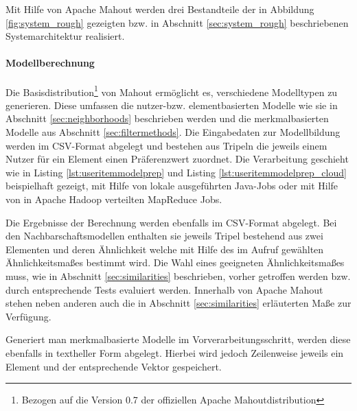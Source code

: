 
Mit Hilfe von Apache Mahout werden drei  Bestandteile der in Abbildung \ref{fig:system_rough} gezeigten bzw. in Abschnitt \ref{sec:system_rough} beschriebenen Systemarchitektur realisiert. 

\paragraph{Modellberechnung} Die Basisdistribution\footnote{Bezogen auf die Version 0.7 der offiziellen Apache Mahoutdistribution} von Mahout ermöglicht es, verschiedene Modelltypen zu generieren. Diese umfassen die nutzer-bzw. elementbasierten Modelle wie sie in Abschnitt \ref{sec:neighborhoods} beschrieben werden und die merkmalbasierten Modelle aus Abschnitt \ref{sec:filtermethods}. Die Eingabedaten zur Modellbildung werden im CSV-Format abgelegt und bestehen aus Tripeln die jeweils einem Nutzer für ein Element einen Präferenzwert zuordnet. Die Verarbeitung geschieht wie in Listing \ref{lst:useritemmodelprep} und Listing \ref{lst:useritemmodelprep_cloud} beispielhaft gezeigt, mit Hilfe von lokale ausgeführten Java-Jobs oder mit Hilfe von in Apache Hadoop verteilten MapReduce Jobs.

  
 
 
Die Ergebnisse der Berechnung werden ebenfalls im CSV-Format abgelegt. Bei den Nachbarschaftsmodellen enthalten sie jeweils Tripel bestehend aus zwei Elementen und deren Ähnlichkeit welche mit Hilfe des im Aufruf gewählten Ähnlichkeitsmaßes bestimmt wird. Die Wahl eines geeigneten Ähnlichkeitsmaßes muss, wie in Abschnitt \ref{sec:similarities} beschrieben, vorher getroffen werden bzw. durch entsprechende Tests evaluiert werden. Innerhalb von Apache Mahout stehen neben anderen auch die in Abschnitt \ref{sec:similarities} erläuterten Maße zur Verfügung.

Generiert man merkmalbasierte Modelle im Vorverarbeitungsschritt, werden diese ebenfalls in textheller Form abgelegt. Hierbei wird jedoch Zeilenweise jeweils ein Element und der entsprechende Vektor gespeichert.

